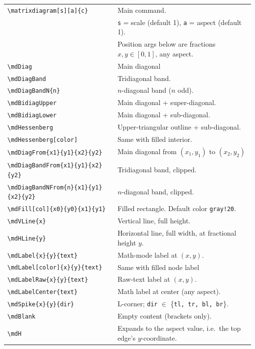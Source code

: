\documentclass[11pt,english]{article}
\begin{document}
\noindent
\begin{tabularx}{\linewidth}{lX}
\toprule
\verb|\matrixdiagram[s][a]{c}|
  & Main command. \\
  & \texttt{s} = scale (default 1), \texttt{a} = aspect (default 1). \\
  & Position args below are fractions $x,y \in [0,1]$, any aspect. \\
\midrule
\verb|\mdDiag|
  & Main diagonal \\
\verb|\mdDiagBand|
  & Tridiagonal band. \\
\verb|\mdDiagBandN{n}|
  & $n$-diagonal band ($n$ odd). \\
\verb|\mdBidiagUpper|
  & Main diagonal + super-diagonal. \\
\verb|\mdBidiagLower|
  & Main diagonal + sub-diagonal. \\
\verb|\mdHessenberg|
  & Upper-triangular outline + sub-diagonal. \\
\verb|\mdHessenberg[color]|
  & Same with filled interior. \\
\midrule
\verb|\mdDiagFrom{x1}{y1}{x2}{y2}|
  & Main diagonal from $(x_1,y_1)$ to $(x_2,y_2)$ \\
\verb|\mdDiagBandFrom{x1}{y1}{x2}{y2}|
  & Tridiagonal band, clipped. \\
\verb|\mdDiagBandNFrom{n}{x1}{y1}{x2}{y2}|
  & $n$-diagonal band, clipped. \\
\midrule
\verb|\mdFill[col]{x0}{y0}{x1}{y1}|
  & Filled rectangle. Default color \texttt{gray!20}. \\
\verb|\mdVLine{x}|
  & Vertical line, full height. \\
\verb|\mdHLine{y}|
  & Horizontal line, full width, at fractional height $y$. \\
\midrule
\verb|\mdLabel{x}{y}{text}|
  & Math-mode label at $(x,y)$. \\
\verb|\mdLabel[color]{x}{y}{text}|
  & Same with filled node label\\
\verb|\mdLabelRaw{x}{y}{text}|
  & Raw-text label at $(x,y)$. \\
\verb|\mdLabelCenter{text}|
  & Math label at center (any aspect). \\
\midrule
\verb|\mdSpike{x}{y}{dir}|
  & L-corner; \texttt{dir} $\in$ \{\texttt{tl, tr, bl, br}\}. \\
\verb|\mdBlank|
  & Empty content (brackets only). \\
\verb|\mdH|
  & Expands to the aspect value, i.e.\ the top edge's $y$-coordinate. \\
\bottomrule
\end{tabularx}
\end{document}
